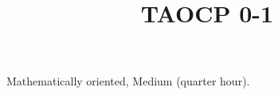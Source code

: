 \documentclass{article}
\title{TAOCP 0\mbox{-}1}
\begin{document}
\maketitle

Mathematically oriented, Medium (quarter hour).
\end{document}

